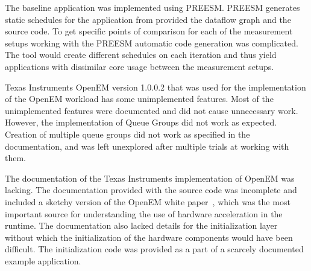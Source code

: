 The baseline application was implemented using PREESM. PREESM generates static schedules for the application from provided the dataflow graph and the source code. To get specific points of comparison for each of the measurement setups working with the PREESM automatic code generation was complicated. The tool would create different schedules on each iteration and thus yield applications with dissimilar core usage between the measurement setups.

Texas Instruments OpenEM version 1.0.0.2 that was used for the implementation of the OpenEM workload has some unimplemented features. Most of the unimplemented features were documented and did not cause unnecessary work. However, the implementation of Queue Groups did not work as expected. Creation of multiple queue groups did not work as specified in the documentation, and was left unexplored after multiple trials at working with them.

The documentation of the Texas Instruments implementation of OpenEM was lacking. The documentation provided with the source code was incomplete and included a sketchy version of the OpenEM white paper~\cite{moerman2014open}, which was the most important source for understanding the use of hardware acceleration in the runtime. The documentation also lacked details for the initialization layer without which the initialization of the hardware components would have been difficult. The initialization code was provided as a part of a scarcely documented example application.
